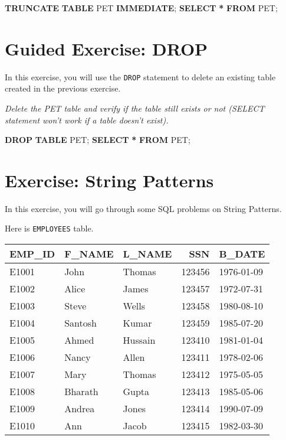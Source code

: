\documentclass[
]{book}
\newenvironment{Shaded}{\begin{snugshade}}{\end{snugshade}}
\newcommand{\KeywordTok}[1]{\textcolor[rgb]{0.13,0.29,0.53}{\textbf{#1}}}
\newcommand{\NormalTok}[1]{#1}
\newcommand{\OperatorTok}[1]{\textcolor[rgb]{0.81,0.36,0.00}{\textbf{#1}}}
\begin{document}
\begin{Shaded}
\begin{Highlighting}[]
\KeywordTok{TRUNCATE} \KeywordTok{TABLE}\NormalTok{ PET }\KeywordTok{IMMEDIATE}\NormalTok{;}
\KeywordTok{SELECT} \OperatorTok{*} \KeywordTok{FROM}\NormalTok{ PET;}
\end{Highlighting}
\end{Shaded}

\hypertarget{guided-exercise-drop}{%
\section{Guided Exercise: DROP}\label{guided-exercise-drop}}

In this exercise, you will use the \texttt{DROP} statement to delete an existing table created in the previous exercise.

{\emph{Delete the PET table and verify if the table still exists or not (SELECT statement won't work if a table doesn't exist).
}}

\begin{Shaded}
\begin{Highlighting}[]
\KeywordTok{DROP} \KeywordTok{TABLE}\NormalTok{ PET;}
\KeywordTok{SELECT} \OperatorTok{*} \KeywordTok{FROM}\NormalTok{ PET;}
\end{Highlighting}
\end{Shaded}

\hypertarget{exercise-string-patterns}{%
\section{Exercise: String Patterns}\label{exercise-string-patterns}}

In this exercise, you will go through some SQL problems on String Patterns.

Here is \texttt{EMPLOYEES} table.

\begin{tabular}{l|l|l|r|l}
\hline
EMP\_ID & F\_NAME & L\_NAME & SSN & B\_DATE\\
\hline
E1001 & John & Thomas & 123456 & 1976-01-09\\
\hline
E1002 & Alice & James & 123457 & 1972-07-31\\
\hline
E1003 & Steve & Wells & 123458 & 1980-08-10\\
\hline
E1004 & Santosh & Kumar & 123459 & 1985-07-20\\
\hline
E1005 & Ahmed & Hussain & 123410 & 1981-01-04\\
\hline
E1006 & Nancy & Allen & 123411 & 1978-02-06\\
\hline
E1007 & Mary & Thomas & 123412 & 1975-05-05\\
\hline
E1008 & Bharath & Gupta & 123413 & 1985-05-06\\
\hline
E1009 & Andrea & Jones & 123414 & 1990-07-09\\
\hline
E1010 & Ann & Jacob & 123415 & 1982-03-30\\
\hline
\end{tabular}
\end{document}
